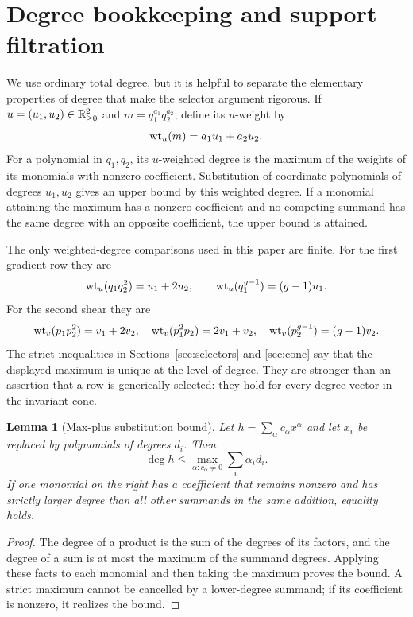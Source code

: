 \documentclass[11pt]{article}
\newtheorem{lemma}[theorem]{Lemma}
\theoremstyle{remark}
\numberwithin{equation}{section}
\begin{document}
\section{Degree bookkeeping and support filtration}\label{sec:bookkeeping}

We use ordinary total degree, but it is helpful to separate the elementary
properties of degree that make the selector argument rigorous.  If
\(u=(u_1,u_2)\in\mathbb{R}_{\geq0}^2\) and
\(m=q_1^{a_1}q_2^{a_2}\), define its \(u\)-weight by
\[
 \operatorname{wt}_u(m)=a_1u_1+a_2u_2.
\]
For a polynomial in \(q_1,q_2\), its \(u\)-weighted degree is the maximum of
the weights of its monomials with nonzero coefficient.  Substitution of
coordinate polynomials of degrees \(u_1,u_2\) gives an upper bound by this
weighted degree.  If a monomial attaining the maximum has a nonzero
coefficient and no competing summand has the same degree with an opposite
coefficient, the upper bound is attained.

The only weighted-degree comparisons used in this paper are finite.  For the
first gradient row they are
\[
 \operatorname{wt}_u(q_1q_2^2)=u_1+2u_2,\qquad
 \operatorname{wt}_u(q_1^{g-1})=(g-1)u_1.
\]
For the second shear they are
\[
 \operatorname{wt}_v(p_1p_2^2)=v_1+2v_2,\quad
 \operatorname{wt}_v(p_1^2p_2)=2v_1+v_2,\quad
 \operatorname{wt}_v(p_2^{g-1})=(g-1)v_2.
\]
The strict inequalities in Sections~\ref{sec:selectors} and
\ref{sec:cone} say that the displayed maximum is unique at the level of
degree.  They are stronger than an assertion that a row is generically
selected: they hold for every degree vector in the invariant cone.

\begin{lemma}[Max-plus substitution bound]\label{lem:maxplus}
Let \(h=\sum_\alpha c_\alpha x^\alpha\) and let \(x_i\) be replaced by
polynomials of degrees \(d_i\).  Then
\[
 \deg h\leq\max_{\alpha:c_\alpha\neq0}\sum_i\alpha_i d_i.
\]
If one monomial on the right has a coefficient that remains nonzero and has
strictly larger degree than all other summands in the same addition, equality
holds.
\end{lemma}

\begin{proof}
The degree of a product is the sum of the degrees of its factors, and the
degree of a sum is at most the maximum of the summand degrees.  Applying these
facts to each monomial and then taking the maximum proves the bound.  A strict
maximum cannot be cancelled by a lower-degree summand; if its coefficient is
nonzero, it realizes the bound.
\end{proof}
\end{document}
